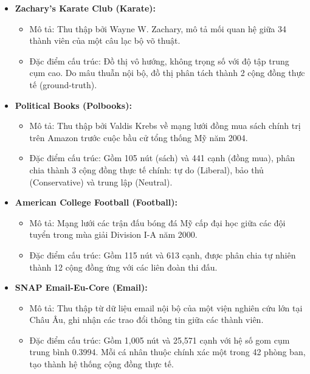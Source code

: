\documentclass[14pt,a4paper]{extarticle}
\begin{document}
\begin{itemize}
    \item \textbf{Zachary's Karate Club (Karate):}
    \begin{itemize}
        \item Mô tả: Thu thập bởi Wayne W. Zachary, mô tả mối quan hệ giữa 34 thành viên của một câu lạc bộ võ thuật.
        \item Đặc điểm cấu trúc: Đồ thị vô hướng, không trọng số với độ tập trung cụm cao. Do mâu thuẫn nội bộ, đồ thị phân tách thành 2 cộng đồng thực tế (ground-truth).
    \end{itemize}

    \item \textbf{Political Books (Polbooks):}
    \begin{itemize}
        \item Mô tả: Thu thập bởi Valdis Krebs về mạng lưới đồng mua sách chính trị trên Amazon trước cuộc bầu cử tổng thống Mỹ năm 2004.
        \item Đặc điểm cấu trúc: Gồm 105 nút (sách) và 441 cạnh (đồng mua), phân chia thành 3 cộng đồng thực tế chính: tự do (Liberal), bảo thủ (Conservative) và trung lập (Neutral).
    \end{itemize}

    \item \textbf{American College Football (Football):}
    \begin{itemize}
        \item Mô tả: Mạng lưới các trận đấu bóng đá Mỹ cấp đại học giữa các đội tuyển trong mùa giải Division I-A năm 2000.
        \item Đặc điểm cấu trúc: Gồm 115 nút và 613 cạnh, được phân chia tự nhiên thành 12 cộng đồng ứng với các liên đoàn thi đấu.
    \end{itemize}

    \item \textbf{SNAP Email-Eu-Core (Email):}
    \begin{itemize}
        \item Mô tả: Thu thập từ dữ liệu email nội bộ của một viện nghiên cứu lớn tại Châu Âu, ghi nhận các trao đổi thông tin giữa các thành viên.
        \item Đặc điểm cấu trúc: Gồm 1,005 nút và 25,571 cạnh với hệ số gom cụm trung bình 0.3994. Mỗi cá nhân thuộc chính xác một trong 42 phòng ban, tạo thành hệ thống cộng đồng thực tế.
    \end{itemize}

\end{itemize}
\end{document}
